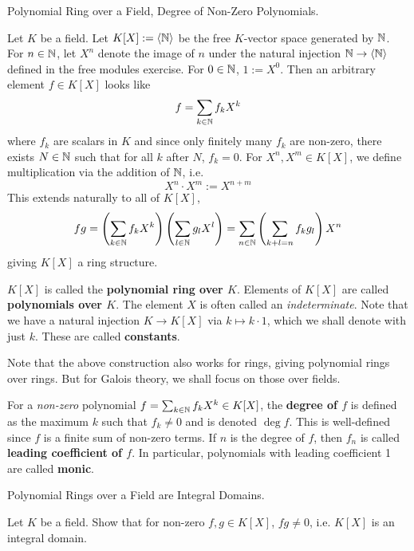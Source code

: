 \documentclass[../../book.tex]{subfiles}
\begin{document}
\begin{dfn} Polynomial Ring over a Field, Degree of Non-Zero Polynomials. 

    Let $K$ be a field. 
    Let $K[X] := \langle\mathbb{N}\rangle$ be the free $K$-vector space generated by $\mathbb{N}$.
    For $n \in \mathbb{N}$, let $X^n$ denote the image of $n$ 
    under the natural injection $\mathbb{N} \to \langle\mathbb{N}\rangle$ 
    defined in the free modules exercise. 
    For $0 \in \mathbb{N}$, $1 := X^0$. 
    Then an arbitrary element $f \in K[X]$ looks like \[
        f = \sum_{k \in \mathbb{N}} f_k X^k
    \]
    where $f_k$ are scalars in $K$ and
    since only finitely many $f_k$ are non-zero,
    there exists $N \in \mathbb{N}$ such that for all $k$ after $N$, $f_k = 0$. 
    For $X^n, X^m \in K[X]$, we define multiplication via the addition of $\mathbb{N}$,
    i.e. \[X^n \cdot X^m := X^{n + m}\]
    This extends naturally to all of $K[X]$, \[
    fg = \left(\sum_{k \in \mathbb{N}} f_k X^k\right)\left(\sum_{l \in \mathbb{N}} g_l X^l\right) 
    = \sum_{n \in \mathbb{N}} \left(\sum_{k + l = n} f_k g_l\right) X^n
    \]
    giving $K[X]$ a ring structure.
    
    $K[X]$ is called the \textbf{polynomial ring over $K$}.
    Elements of $K[X]$ are called \textbf{polynomials over $K$}. 
    The element $X$ is often called an \emph{indeterminate}. 
    Note that we have a natural injection $K \to K[X]$ via $k \mapsto k\cdot 1$,
    which we shall denote with just $k$. 
    These are called \textbf{constants}. 
    
    Note that the above construction also works for rings, 
    giving polynomial rings over rings.
    But for Galois theory, we shall focus on those over fields. 
    
    For a \emph{non-zero} polynomial $f = \sum_{k \in \mathbb{N}} f_k X^k\in K[X]$, 
    the \textbf{degree of $f$} is defined as 
    the maximum $k$ such that $f_k \neq 0$ and is denoted $\deg f$. 
    This is well-defined since $f$ is a finite sum of non-zero terms. 
    If $n$ is the degree of $f$, then $f_n$ is called 
    \textbf{leading coefficient of $f$}. 
    In particular, polynomials with leading coefficient 1 are called \textbf{monic}.
\end{dfn}

\begin{ex} [Important] Polynomial Rings over a Field are Integral Domains. 
    
    Let $K$ be a field. 
    Show that for non-zero $f, g \in K[X]$, $fg \neq 0$,
    i.e. $K[X]$ is an integral domain. 
\end{ex}
\end{document}
